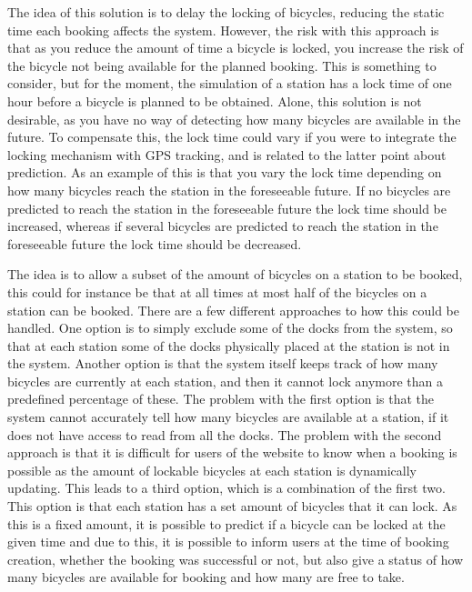 \begin{description}[style=nextline]
		\item[Lock late]
		The idea of this solution is to delay the locking of bicycles, reducing the static time each booking affects the system.
		However, the risk with this approach is that as you reduce the amount of time a bicycle is locked, you increase the risk of the bicycle not being available for the planned booking.
		This is something to consider, but for the moment, the simulation of a station has a lock time of one hour before a bicycle is planned to be obtained.
		Alone, this solution is not desirable, as you have no way of detecting how many bicycles are available in the future.
		To compensate this, the lock time could vary if you were to integrate the locking mechanism with GPS tracking, and is related to the latter point about prediction.
		As an example of this is that you vary the lock time depending on how many bicycles reach the station in the foreseeable future. 
		If no bicycles are predicted to reach the station in the foreseeable future the lock time should be increased, whereas if several bicycles are predicted to reach the station in the foreseeable future the lock time should be decreased.
		
		\item[Subset of bicycles for booking]
		The idea is to allow a subset of the amount of bicycles on a station to be booked, this could for instance be that at all times at most half of the bicycles on a station can be booked.
		There are a few different approaches to how this could be handled.
		One option is to simply exclude some of the docks from the system, so that at each station some of the docks physically placed at the station is not in the system.
		Another option is that the system itself keeps track of how many bicycles are currently at each station, and then it cannot lock anymore than a predefined percentage of these.
		The problem with the first option is that the system cannot accurately tell how many bicycles are available at a station, if it does not have access to read from all the docks.
		The problem with the second approach is that it is difficult for users of the website to know when a booking is possible as the amount of lockable bicycles at each station is dynamically updating.
		This leads to a third option, which is a combination of the first two.
		This option is that each station has a set amount of bicycles that it can lock.
		As this is a fixed amount, it is possible to predict if a bicycle can be locked at the given time and due to this, it is possible to inform users at the time of booking creation, whether the booking was successful or not, but also give a status of how many bicycles are available for booking and how many are free to take.
		

\end{description}

